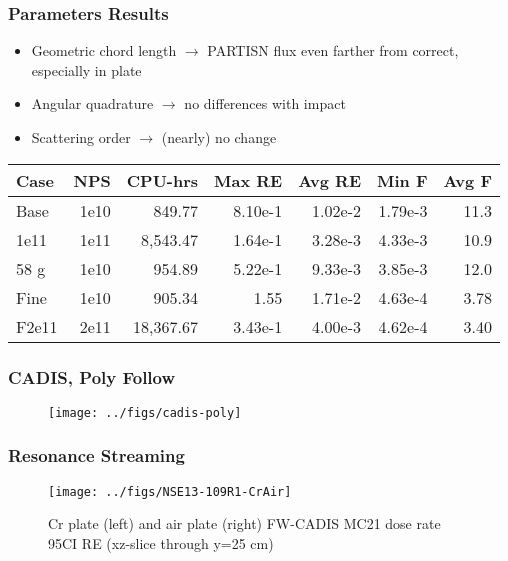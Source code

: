 \documentclass[xcolor=x11names,compress]{beamer}
\renewcommand{\(}{\begin{columns}}
\renewcommand{\)}{\end{columns}}
\newcommand{\<}[1]{\begin{column}{#1}}
\renewcommand{\>}{\end{column}}
\begin{document}
\begin{frame}[fragile]
  \frametitle{Parameters Results}
  
  	\begin{itemize}
  	\item Geometric chord length $\rightarrow$ PARTISN flux even farther from correct, especially in plate
  	\item Angular quadrature $\rightarrow$ no differences with impact
	\item Scattering order $\rightarrow$ (nearly) no change
  	\end{itemize}
  	
  \begin{center}
    \begin{tabu}{|l|r|r|r|r|r|r|}\hline
      Case & NPS & CPU-hrs & Max RE & Avg RE & Min F & Avg F\\\hline
Base      & 1e10 & 849.77    & 8.10e-1 & 1.02e-2 & 1.79e-3 & 11.3\\
%
1e11 & 1e11 & 8,543.47  & 1.64e-1 & 3.28e-3 & 4.33e-3 & 10.9\\
%
58 g & 1e10 & 954.89    & 5.22e-1 & 9.33e-3 & 3.85e-3 & 12.0\\
%
Fine & 1e10 & 905.34    & 1.55  & 1.71e-2 & 4.63e-4 & 3.78\\
%
F2e11 & 2e11 & 18,367.67 & 3.43e-1 & 4.00e-3 & 4.62e-4 & 3.40\\\hline
    \end{tabu}
  \end{center}

\end{frame}

\begin{frame}[fragile]
  \frametitle{CADIS, Poly Follow}
 \begin{figure}[p]
   \begin{center}
     \texttt{[image: ../figs/cadis-poly]}
   \end{center}
 \end{figure}
\end{frame}

\begin{frame}[fragile]
  \frametitle{Resonance Streaming}
   \begin{figure}[p]
   \begin{center}
     \texttt{[image: ../figs/NSE13-109R1-CrAir]}
   \end{center}
   \caption{Cr plate (left) and air plate (right) FW-CADIS MC21 dose rate 95CI RE (xz-slice through y=25 cm)}
   \label{fig:CrAir}
 \end{figure}
\end{frame}
\end{document}
